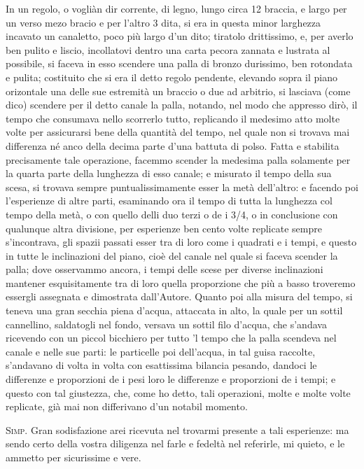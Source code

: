\documentclass[11pt,twoside,openany]{book}
\newcommand{\speaker}[1]{\textcolor{rubric}{\textsc{#1}}\space}
\begin{document}
In un regolo, o vogliàn dir corrente, di legno, lungo circa 12 braccia, e largo per un verso mezo bracio e per l'altro 3 dita, si era in questa minor larghezza incavato un canaletto, poco più largo d'un dito; tiratolo drittissimo, e, per averlo ben pulito e liscio, incollatovi dentro una carta pecora zannata e lustrata al possibile, si faceva in esso scendere una palla di bronzo durissimo, ben rotondata e pulita; costituito che si era il detto regolo pendente, elevando sopra il piano orizontale una delle sue estremità un braccio o due ad arbitrio, si lasciava (come dico) scendere per il detto canale la palla, notando, nel modo che appresso dirò, il tempo che consumava nello scorrerlo tutto, replicando il medesimo atto molte volte per assicurarsi bene della quantità del tempo, nel quale non si trovava mai differenza né anco della decima parte d'una battuta di polso. Fatta e stabilita precisamente tale operazione, facemmo scender la medesima palla solamente per la quarta parte della lunghezza di esso canale; e misurato il tempo della sua scesa, si trovava sempre puntualissimamente esser la metà dell'altro: e facendo poi l'esperienze di altre parti, esaminando ora il tempo di tutta la lunghezza col tempo della metà, o con quello delli duo terzi o de i 3/4, o in conclusione con qualunque altra divisione, per esperienze ben cento volte replicate sempre s'incontrava, gli spazii passati esser tra di loro come i quadrati e i tempi, e questo in tutte le inclinazioni del piano, cioè del canale nel quale si faceva scender la palla; dove osservammo ancora, i tempi delle scese per diverse inclinazioni mantener esquisitamente tra di loro quella proporzione che più a basso troveremo essergli assegnata e dimostrata dall'Autore. Quanto poi alla misura del tempo, si teneva una gran secchia piena d'acqua, attaccata in alto, la quale per un sottil cannellino, saldatogli nel fondo, versava un sottil filo d'acqua, che s'andava ricevendo con un piccol bicchiero per tutto 'l tempo che la palla scendeva nel canale e nelle sue parti: le particelle poi dell'acqua, in tal guisa raccolte, s'andavano di volta in volta con esattissima bilancia pesando, dandoci le differenze e proporzioni de i pesi loro le differenze e proporzioni de i tempi; e questo con tal giustezza, che, come ho detto, tali operazioni, molte e molte volte replicate, già mai non differivano d'un notabil momento.

\speaker{Simp.} Gran sodisfazione arei ricevuta nel trovarmi presente a tali esperienze: ma sendo certo della vostra diligenza nel farle e fedeltà nel referirle, mi quieto, e le ammetto per sicurissime e vere.
\end{document}
